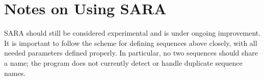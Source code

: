 \section{Notes on Using SARA}

SARA should still be considered experimental and is under ongoing improvement. It is important to follow the scheme for defining sequences above closely, with all needed parameters defined properly. In particular, no two sequences should share a name; the program does not currently detect or handle duplicate sequence names.
